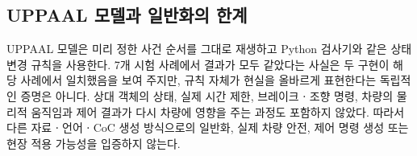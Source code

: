 \subsection{UPPAAL 모델과 일반화의 한계}
UPPAAL 모델은 미리 정한 사건 순서를 그대로 재생하고 Python 검사기와 같은 상태 변경 규칙을 사용한다. 7개 시험 사례에서 결과가 모두 같았다는 사실은 두 구현이 해당 사례에서 일치했음을 보여 주지만, 규칙 자체가 현실을 올바르게 표현한다는 독립적인 증명은 아니다. 상대 객체의 상태, 실제 시간 제한, 브레이크ㆍ조향 명령, 차량의 물리적 움직임과 제어 결과가 다시 차량에 영향을 주는 과정도 포함하지 않았다. 따라서 다른 자료ㆍ언어ㆍCoC 생성 방식으로의 일반화, 실제 차량 안전, 제어 명령 생성 또는 현장 적용 가능성을 입증하지 않는다.
